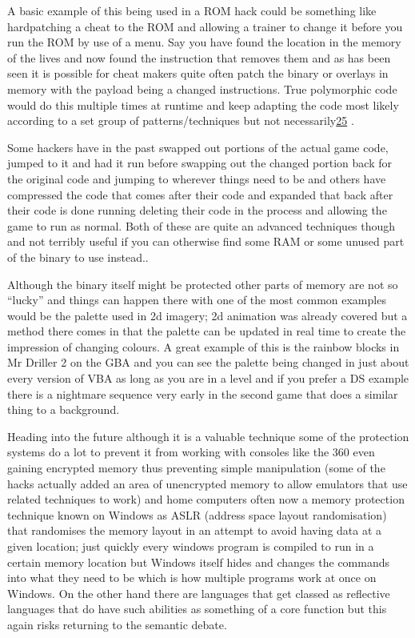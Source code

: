 \documentclass[
]{book}
\begin{document}
A basic example of this being used in a ROM hack could be something like hardpatching a cheat to the ROM and allowing a trainer to change it before you run the ROM by use of a menu. Say you have found the location in the memory of the lives and now found the instruction that removes them and as has been seen it is possible for cheat makers quite often patch the binary or overlays in memory with the payload being a changed instructions. True polymorphic code would do this multiple times at runtime and keep adapting the code most likely according to a set group of patterns/techniques but not necessarily\href{romhacking202026.html\#fn25x0}{25} .

Some hackers have in the past swapped out portions of the actual game code, jumped to it and had it run before swapping out the changed portion back for the original code and jumping to wherever things need to be and others have compressed the code that comes after their code and expanded that back after their code is done running deleting their code in the process and allowing the game to run as normal. Both of these are quite an advanced techniques though and not terribly useful if you can otherwise find some RAM or some unused part of the binary to use instead..

Although the binary itself might be protected other parts of memory are not so ``lucky'' and things can happen there with one of the most common examples would be the palette used in 2d imagery; 2d animation was already covered but a method there comes in that the palette can be updated in real time to create the impression of changing colours. A great example of this is the rainbow blocks in Mr Driller 2 on the GBA and you can see the palette being changed in just about every version of VBA as long as you are in a level and if you prefer a DS example there is a nightmare sequence very early in the second game that does a similar thing to a background.

Heading into the future although it is a valuable technique some of the protection systems do a lot to prevent it from working with consoles like the 360 even gaining encrypted memory thus preventing simple manipulation (some of the hacks actually added an area of unencrypted memory to allow emulators that use related techniques to work) and home computers often now a memory protection technique known on Windows as ASLR (address space layout randomisation) that randomises the memory layout in an attempt to avoid having data at a given location; just quickly every windows program is compiled to run in a certain memory location but Windows itself hides and changes the commands into what they need to be which is how multiple programs work at once on Windows. On the other hand there are languages that get classed as reflective languages that do have such abilities as something of a core function but this again risks returning to the semantic debate.
\end{document}
